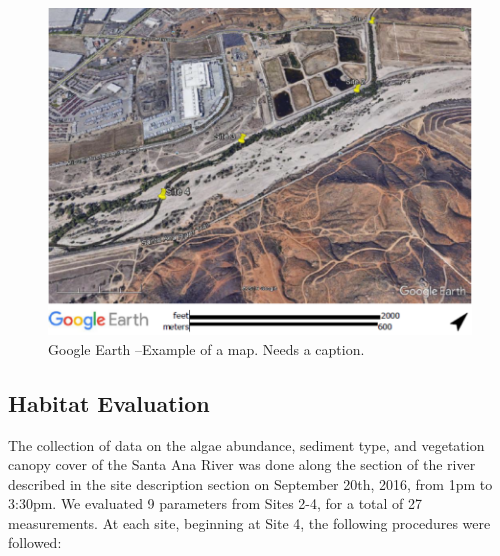 \documentclass{article}\usepackage[]{graphicx}\usepackage[]{color}
\begin{document}
\begin{figure}[!ht]
\includegraphics[width=1.00\textwidth]{Figures/SiteMap}
\caption{Google Earth --Example of a map. Needs a caption.}
\label{SAR_Image}
\end{figure}

\subsection{Habitat Evaluation}

The collection of data on the algae abundance, sediment type, and vegetation canopy cover of the Santa Ana River was done along the section of the river described in the site description section on September 20th, 2016, from 1pm to 3:30pm. We evaluated 9 parameters from Sites 2-4, for a total of 27 measurements. At each site, beginning at Site 4, the following procedures were followed: 
\end{document}
